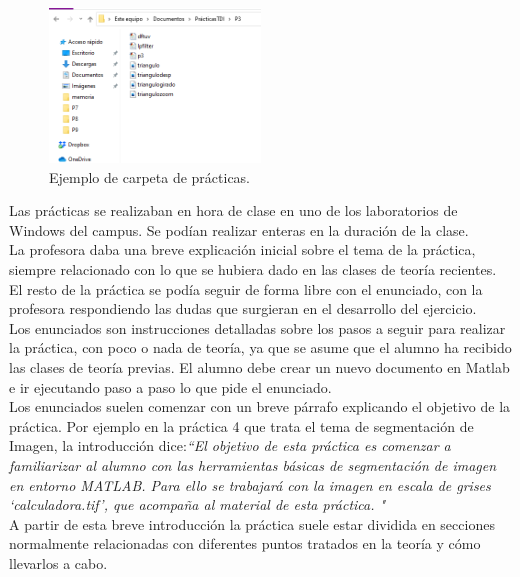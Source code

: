 \documentclass[a4paper,12pt]{report}
\begin{document}
\begin{figure}[h]
\centering
\includegraphics[width=0.5\textwidth]{imagenes/carpetapracticas}
\caption{Ejemplo de carpeta de prácticas.}
\label{carpetapracticas}
\end{figure}

Las prácticas se realizaban en hora de clase en uno de los laboratorios de Windows del campus. Se podían realizar enteras en la duración de la clase. \\

La profesora daba una breve explicación inicial sobre el tema de la práctica, siempre relacionado con lo que se hubiera dado en las clases de teoría recientes. El resto de la práctica se podía seguir de forma libre con el enunciado, con la profesora respondiendo las dudas que surgieran en el desarrollo del ejercicio. \\

Los enunciados son instrucciones detalladas sobre los pasos a seguir para realizar la práctica, con poco o nada de teoría, ya que se asume que el alumno ha recibido las clases de teoría previas. El alumno debe crear un nuevo documento en Matlab e ir ejecutando paso a paso lo que pide el enunciado. \\

Los enunciados suelen comenzar con un breve párrafo explicando el objetivo de la práctica. Por ejemplo en la práctica 4 que trata el tema de segmentación de Imagen, la introducción dice:\emph{``El objetivo de esta práctica es comenzar a familiarizar al alumno con las herramientas básicas de segmentación de imagen en entorno MATLAB. Para ello se trabajará con la imagen en escala de
grises ‘calculadora.tif’, que acompaña al material de esta práctica. "}\\

A partir de esta breve introducción la práctica suele estar dividida en secciones normalmente relacionadas con diferentes puntos tratados en la teoría y cómo llevarlos a cabo.\\
\end{document}
